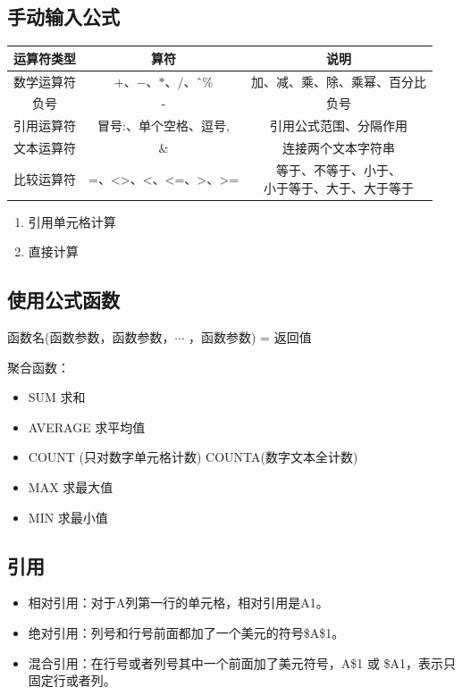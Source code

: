 \subsection{手动输入公式}

\begin{table}[ht]
    \centering
    \begin{tabular}{|c|c|c|}
    \hline
    运算符类型 & 算符 & 说明 \\ \hline
    数学运算符 & $+$、$-$、$*$、$/$、\^ \ \% & 加、减、乘、除、乘幂、百分比 \\ \hline
    负号 & - & 负号 \\ \hline
    引用运算符 & 冒号:、单个空格、逗号, & 引用公式范围、分隔作用 \\ \hline
    文本运算符 & \& & 连接两个文本字符串 \\ \hline
    比较运算符 & =、<>、<、<=、>、>= & \makecell{等于、不等于、小于、\\ 小于等于、大于、大于等于} \\ \hline
    \end{tabular}
    \end{table}

    \begin{enumerate}
        \item 引用单元格计算
        \item 直接计算
    \end{enumerate}

\subsection{使用公式函数}

函数名(函数参数，函数参数，$\cdots$ ，函数参数) = 返回值

聚合函数：
\begin{itemize}
    \item SUM 求和
    \item AVERAGE 求平均值
    \item COUNT (只对数字单元格计数) COUNTA(数字文本全计数)
    \item MAX 求最大值
    \item MIN 求最小值
\end{itemize}

\subsection{引用}

\begin{itemize}
    \item 相对引用：对于A列第一行的单元格，相对引用是A1。
    \item 绝对引用：列号和行号前面都加了一个美元的符号\$A\$1。
    \item 混合引用：在行号或者列号其中一个前面加了美元符号，A\$1 或 \$A1，表示只固定行或者列。
\end{itemize}

